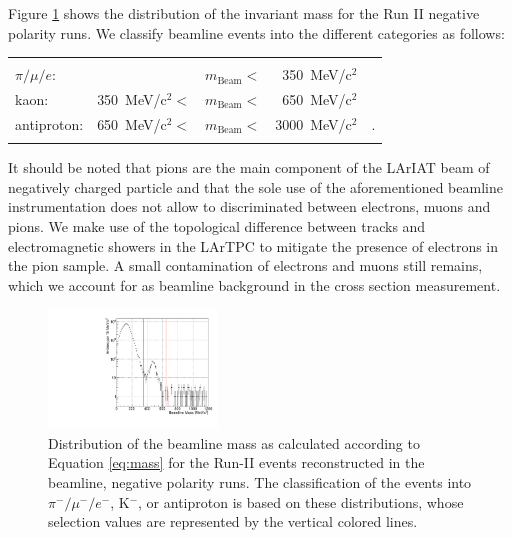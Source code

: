 \documentclass[aps,prl,twocolumn,showpacs,superscriptaddress,groupedaddress]{revtex4}  %
\begin{document}
Figure \ref{fig:mass} shows the distribution of the invariant mass for the Run II negative polarity runs. We classify beamline events into the different categories as follows:

\begin{tabular}{lllrl}
& & & &\\
 $\pi/\mu/e$: &                               & $m_{\text{Beam}}<$& 350~MeV/c$^2$&\\
 kaon:           & 350~MeV/c$^2 <$ & $m_{\text{Beam}}<$& 650~MeV/c$^2$&\\
 antiproton:   & 650~MeV/c$^2 <$ & $m_{\text{Beam}}<$& 3000~MeV/c$^2$&.\\
& & & &\\
\end{tabular}



It should be noted that pions are the main component of the LArIAT beam of negatively charged particle and that the sole use of the aforementioned beamline instrumentation does not allow to discriminated between electrons, muons and pions. We make use of the topological difference between tracks and electromagnetic showers in the LArTPC  to mitigate the presence of electrons in the pion sample. A small contamination of electrons and muons still remains, which we account for as beamline background in the cross section measurement.

\begin{figure}
  \centering  
\includegraphics[width =0.4\textwidth]{massRunII.pdf}
\caption{Distribution of the beamline mass as calculated according to Equation \ref{eq:mass} for the Run-II events reconstructed in the beamline, negative polarity runs. The classification of the events into $\pi^-/ \mu^-/e^-$, K$^-$, or antiproton is based on these distributions, whose selection values are represented by the vertical colored lines.}
\label{fig:mass}
\end{figure}
\end{document}
